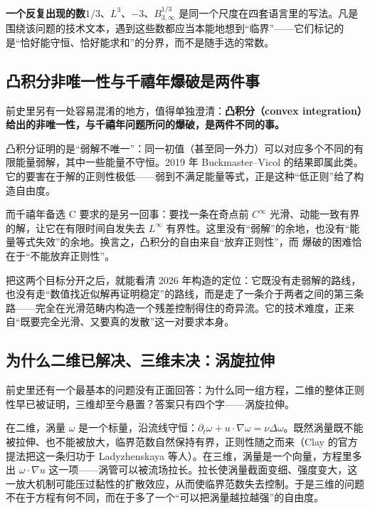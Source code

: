 \begin{principlebox}
\textbf{一个反复出现的数}\quad $1/3$、$L^{3}$、$-3$、$B^{1/3}_{3,\infty}$ 是同一个尺度在四套语言里的写法。凡是围绕该问题的技术文本，遇到这些数都应当本能地想到“临界”——它们标记的是“恰好能守恒、恰好能求和”的分界，而不是随手选的常数。
\end{principlebox}

\subsection{凸积分非唯一性与千禧年爆破是两件事}

前史里另有一处容易混淆的地方，值得单独澄清：\textbf{凸积分（convex integration）给出的非唯一性，与千禧年问题所问的爆破，是两件不同的事。}

凸积分证明的是“弱解不唯一”：同一初值（甚至同一外力）可以对应多个不同的有限能量弱解，其中一些能量不守恒。2019 年 Buckmaster--Vicol 的结果即属此类。它的要害在于解的正则性极低——弱到不满足能量等式，正是这种“低正则”给了构造自由度。

而千禧年备选 C 要求的是另一回事：要找一条在奇点前 $C^{\infty}$ 光滑、动能一致有界的解，让它在有限时间自发失去 $L^{\infty}$ 有界性。这里没有“弱解”的余地，也没有“能量等式失效”的余地。换言之，凸积分的自由来自“放弃正则性”，而 \NS{} 爆破的困难恰在于“不能放弃正则性”。

把这两个目标分开之后，就能看清 2026 年构造的定位：它既没有走弱解的路线，也没有走“数值找近似解再证明稳定”的路线，而是走了一条介于两者之间的第三条路——完全在光滑范畴内构造一个残差控制得住的奇异流。它的技术难度，正来自“既要完全光滑、又要真的发散”这一对要求本身。

\subsection{为什么二维已解决、三维未决：涡旋拉伸}

前史里还有一个最基本的问题没有正面回答：为什么同一组方程，二维的整体正则性早已被证明，三维却至今悬置？答案只有四个字——涡旋拉伸。

在二维，涡量 $\omega$ 是一个标量，沿流线守恒：$\partial_{t}\omega+u\cdot\nabla\omega=\nu\Delta\omega$。既然涡量既不能被拉伸、也不能被放大，临界范数自然保持有界，正则性随之而来（Clay 的官方提法把这一条归功于 Ladyzhenskaya 等人）。在三维，涡量是一个向量，方程里多出 $\omega\cdot\nabla u$ 这一项——涡管可以被流场拉长。拉长使涡量截面变细、强度变大，这一放大机制可能压过黏性的扩散效应，从而使临界范数失去控制。于是三维的问题不在于方程有何不同，而在于多了一个“可以把涡量越拉越强”的自由度。


